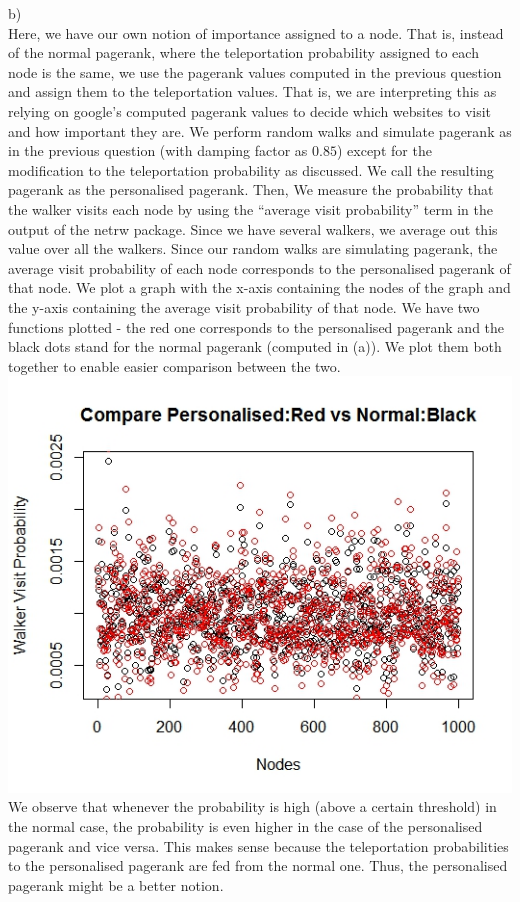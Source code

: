 \documentclass{article}
\begin{document}
b)\\
Here, we have our own notion of importance assigned to a node. That is, instead of the normal pagerank, where
the teleportation probability assigned to each node is the same, we use the pagerank values computed in the previous question
and assign them to the teleportation values. That is, we are interpreting this as relying on google's computed pagerank values
to decide which websites to visit and how important they are. We perform random walks and simulate pagerank as in the 
previous question (with damping factor as $0.85$) except for the modification to the teleportation probability as discussed. We call the resulting pagerank
as the personalised pagerank. Then, 
We measure the probability that the walker visits each node by using the ``average visit probability'' term
in the output of the netrw package. Since we have several walkers, we average out this value over all the walkers.
Since our random walks are simulating pagerank, the average visit probability of each node 
corresponds to the personalised pagerank of that node. We plot a graph with the x-axis containing the nodes of the graph and the y-axis containing the 
average visit probability of that node. We have two functions plotted - the red one corresponds to the personalised
pagerank and the black dots stand for the normal pagerank (computed in (a)). We plot them both together
to enable easier comparison between the two.\\
\includegraphics[scale=0.4]{p4b} \\
We observe that whenever the probability is high (above a certain threshold) in the normal case, the probability
is even higher in the case of the personalised pagerank and vice versa. This makes sense because the teleportation probabilities
to the personalised pagerank are fed from the normal one.
Thus, the personalised pagerank might be a better notion.\\
\end{document}
